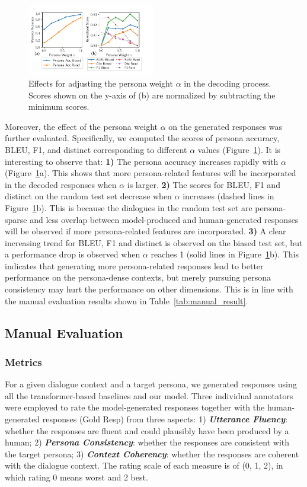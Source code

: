 \documentclass[letterpaper]{article} %
\begin{document}
\begin{figure}[thbp!]
  \centering
  \includegraphics[width=210px]{figures/adjust_w.pdf}
  \caption{Effects for adjusting the persona weight $\alpha$ in the decoding process. Scores shown on the y-axis of (b) are normalized by subtracting the minimum scores.}
  \label{fig:adjust_w}
\end{figure}

Moreover, the effect of the persona weight $\alpha$ on the generated responses was further evaluated. Specifically, we computed the scores of persona accuracy, BLEU, F1, and distinct corresponding to different $\alpha$ values (Figure~\ref{fig:adjust_w}). It is interesting to observe that:
\textbf{1)} The persona accuracy increases rapidly with $\alpha$ (Figure~\ref{fig:adjust_w}a). This shows that more persona-related features will be incorporated in the decoded responses when $\alpha$ is larger.
\textbf{2)} The scores for BLEU, F1 and distinct on the random test set decrease when $\alpha$ increases (dashed lines in Figure~\ref{fig:adjust_w}b). This is because the dialogues in the random test set are persona-sparse and less overlap between model-produced and human-generated responses will be observed if more persona-related features are incorporated.
\textbf{3)} A clear increasing trend for BLEU, F1 and distinct is observed on the biased test set, but a performance drop is observed when $\alpha$ reaches 1 (solid lines in Figure~\ref{fig:adjust_w}b). This indicates that generating more persona-related responses lead to better performance on the persona-dense contexts, but merely pursuing persona consistency may hurt the performance on other dimensions. This is in line with the manual evaluation results shown in Table~\ref{tab:manual_result}.

\subsection{Manual Evaluation}
\subsubsection{Metrics}
For a given dialogue context and a target persona, we generated responses using all the transformer-based baselines and our model. Three individual annotators were employed to rate the model-generated responses together with the human-generated responses (Gold Resp) from three aspects:
1) \emph{\textbf{Utterance Fluency}}: whether the responses are fluent and could plausibly have been produced by a human; 
2) \emph{\textbf{Persona Consistency}}: whether the responses are consistent with the target persona; 
3) \emph{\textbf{Context Coherency}}: whether the responses are coherent with the dialogue context. 
The rating scale of each measure is of (0, 1, 2), in which rating 0 means worst and 2 best.
\end{document}
